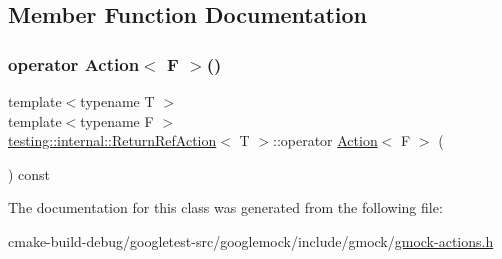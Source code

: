 \subsection{Member Function Documentation}
\mbox{\label{classtesting_1_1internal_1_1ReturnRefAction_a48e5d411097707e558af62eb68edc162}} 
\subsubsection{\texorpdfstring{operator Action$<$ F $>$()}{operator Action< F >()}}
{\footnotesize\ttfamily template$<$typename T $>$ \\
template$<$typename F $>$ \\
\mbox{\hyperlink{classtesting_1_1internal_1_1ReturnRefAction}{testing\+::internal\+::\+Return\+Ref\+Action}}$<$ T $>$\+::operator \mbox{\hyperlink{classtesting_1_1Action}{Action}}$<$ F $>$ (\begin{DoxyParamCaption}{ }\end{DoxyParamCaption}) const\hspace{0.3cm}{\ttfamily [inline]}}



The documentation for this class was generated from the following file\+:\begin{DoxyCompactItemize}
\item 
cmake-\/build-\/debug/googletest-\/src/googlemock/include/gmock/\mbox{\hyperlink{gmock-actions_8h}{gmock-\/actions.\+h}}\end{DoxyCompactItemize}
